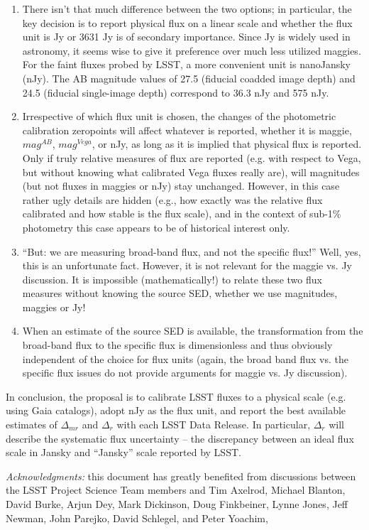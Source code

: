 \documentclass{emulateapj}
\begin{document}
\begin{enumerate}
\item There isn't that much difference between the two options; in particular,  the key 
decision is to report physical flux on a linear scale and whether the flux unit is Jy 
or 3631 Jy is of secondary importance.  Since Jy is widely used in astronomy, it seems 
wise to give it preference over much less utilized maggies. For the faint fluxes
probed by LSST, a more convenient unit is nanoJansky (nJy). The AB magnitude 
values of 27.5 (fiducial coadded image depth)  and 24.5 (fiducial single-image depth) 
correspond to 36.3 nJy and 575 nJy. 

\item Irrespective of which flux unit is chosen, the changes of the photometric 
calibration zeropoints will affect whatever is reported, whether it is maggie, $mag^{AB}$, 
$mag^{Vega}$, or nJy, as long as it is implied that physical flux is reported. Only if
truly relative measures of flux are reported (e.g. with respect to Vega, but without knowing 
what calibrated Vega fluxes really are), will magnitudes (but not fluxes in maggies or 
nJy) stay unchanged. However, in this case rather ugly details are hidden (e.g., how 
exactly was the relative flux calibrated and how stable is the flux scale), and in the context 
of sub-1\% photometry this case appears to be of historical interest only. 
\item ``But: we are measuring broad-band flux, and not the specific flux!''  Well, 
yes, this is an unfortunate fact. However, it is not relevant for the maggie vs. Jy discussion. 
It is impossible (mathematically!) to relate these two flux measures without knowing 
the source SED, whether we use magnitudes, maggies or Jy! 
\item When an estimate of the source SED is available, the transformation from
the broad-band flux to the specific flux is dimensionless and thus obviously independent 
of the choice for flux units (again, the broad band flux vs. the specific flux issues do not provide
arguments for maggie vs. Jy discussion).
\end{enumerate}

In conclusion, the proposal is to calibrate LSST fluxes to a physical scale (e.g. using
Gaia catalogs), adopt nJy as the flux unit, and report the best available estimates of 
$\Delta_{mr}$ and $\Delta_r$ with each LSST Data Release. In particular, $\Delta_r$ 
will describe the systematic flux uncertainty --  the discrepancy between an ideal 
flux scale in Jansky and ``Jansky'' scale reported by LSST. 



{\it Acknowledgments:} this document has greatly benefited from discussions between
the LSST Project Science Team members and Tim Axelrod, Michael Blanton, David 
Burke, Arjun Dey, Mark Dickinson, Doug Finkbeiner, Lynne Jones,  Jeff Newman, 
John Parejko, David Schlegel, and Peter Yoachim,
\end{document}
